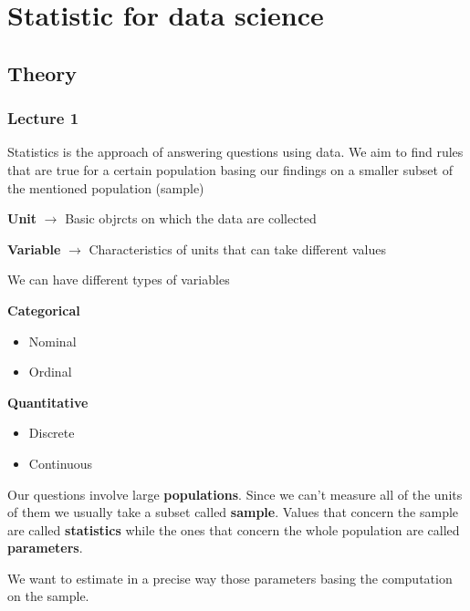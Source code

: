 \section{Statistic for data science}

\subsection{Theory}

\subsubsection{Lecture 1}

Statistics is the approach of answering questions using data. We aim to find rules that are true for a certain population basing our findings on a smaller subset of the mentioned population (sample)

\vspace{10pt}

\textbf{Unit} $\xrightarrow{}$ Basic objrcts on which the data are collected

\textbf{Variable} $\xrightarrow{}$ Characteristics of units that can take different values

\vspace{10pt}

We can have different types of variables
\vspace{10pt}

\textbf{Categorical}
\begin{itemize}
    \item Nominal
    \item Ordinal
\end{itemize}

\textbf{Quantitative}
\begin{itemize}
    \item Discrete
    \item Continuous
\end{itemize}

Our questions involve large \textbf{populations}. Since we can't measure all of the units of them we usually take a subset called \textbf{sample}. Values that concern the sample are called \textbf{statistics} while the ones that concern the whole population are called \textbf{parameters}. 

\vspace{10pt}

We want to estimate in a precise way those parameters basing the computation on the sample.


